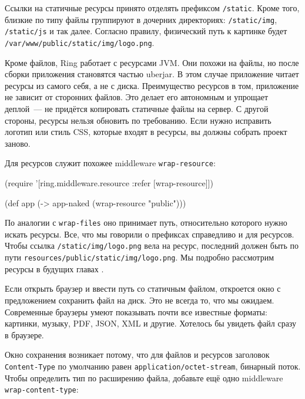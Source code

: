 Ссылки на статичные ресурсы принято отделять префиксом \verb|/static|. Кроме
того, близкие по типу файлы группируют в дочерних директориях:
\verb|/static/img|, \verb|/static/js| и так далее. Согласно правилу,
физический путь к картинке будет \verb|/var/www/public/static/img/logo.png|.

Кроме файлов, Ring работает с ресурсами JVM. Они похожи на файлы, но после
сборки приложения становятся частью uberjar. В этом случае приложение читает
ресурсы из самого себя, а не с диска. Преимущество ресурсов в том, приложение не
зависит от сторонних файлов. Это делает его автономным и упрощает деплой~--- не
придётся копировать статичные файлы на сервер. С другой стороны, ресурсы
нельзя обновить по требованию. Если нужно исправить логотип или стиль CSS,
которые входят в ресурсы, вы должны собрать проект заново.


Для ресурсов служит похожее middleware \verb|wrap-resource|:

\begin{english}
  \begin{clojure}
(require '[ring.middleware.resource
           :refer [wrap-resource]])

(def app (-> app-naked
             (wrap-resource "public")))
  \end{clojure}
\end{english}

По аналогии с \verb|wrap-files| оно принимает путь, относительно которого
нужно искать ресурсы. Все, что мы говорили о префиксах справедливо и для
ресурсов. Чтобы ссылка \verb|/static/img/logo.png| вела на ресурс, последний
должен быть по пути \verb|resources/public/static/img/logo.png|. Мы подробно
рассмотрим ресурсы в будущих главах .

Если открыть браузер и ввести путь со статичным файлом, откроется окно с
предложением сохранить файл на диск. Это не всегда то, что мы
ожидаем. Современные браузеры умеют показывать почти все известные форматы:
картинки, музыку, PDF, JSON, XML и другие. Хотелось бы увидеть файл сразу в
браузере.

Окно сохранения возникает потому, что для файлов и ресурсов заголовок
\verb|Content-Type| по умолчанию равен \verb|application/octet-stream|,
бинарный поток. Чтобы определить тип по расширению файла, добавьте ещё одно
middleware \verb|wrap-content-type|:


